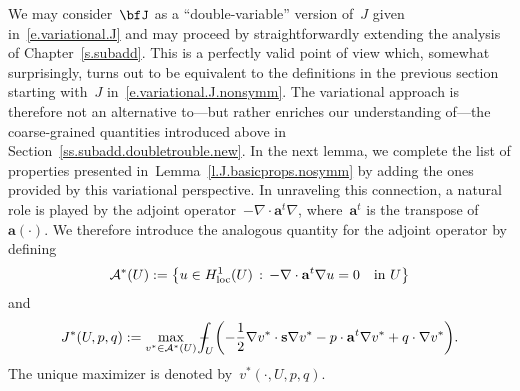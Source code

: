 \documentclass[11pt,twoside]{article} %
\numberwithin{equation}{section}
\theoremstyle{definition}
\let\originalleft\left
\let\originalright\right
\renewcommand{\left}{\mathopen{}\mathclose\bgroup\originalleft}
\renewcommand{\right}{\aftergroup\egroup\originalright}
\newcommand{\s}{\mathbf{s}}
\renewcommand{\a}{\mathbf{a}}
\def\Xint#1{\mathchoice
{\XXint\displaystyle\textstyle{#1}}%
{\XXint\textstyle\scriptstyle{#1}}%
{\XXint\scriptstyle\scriptscriptstyle{#1}}%
{\XXint\scriptscriptstyle\scriptscriptstyle{#1}}%
\!\int}
\def\XXint#1#2#3{{\setbox0=\hbox{$#1{#2#3}{\int}$}
\vcenter{\hbox{$#2#3$}}\kern-.5\wd0}}
\def\fint{\Xint-}
\begin{document}
\smallskip

We may consider~$\bfJ$ as a ``double-variable'' version of~$J$ given in~\eqref{e.variational.J} and may proceed by straightforwardly extending the analysis of Chapter~\ref{s.subadd}.
This is a perfectly valid point of view which, somewhat surprisingly, turns out to be equivalent to the definitions in the previous section starting with~$J$ in~\eqref{e.variational.J.nonsymm}. 
The variational approach is therefore not an alternative to---but rather enriches our understanding of---the coarse-grained quantities introduced above in Section~\ref{ss.subadd.doubletrouble.new}. In the next lemma, we complete the list of properties presented in~Lemma~\ref{l.J.basicprops.nosymm} by adding the ones provided by this variational perspective. In unraveling this connection, a natural role is played by the adjoint operator~$-\nabla \cdot \a^t\nabla$, where~$\a^t$ is the transpose of~$\a(\cdot)$. We therefore introduce the analogous quantity for the adjoint operator by defining
\begin{equation}
\label{e.def.AsU}
\mathcal{A}^*(U) := 
\left\{ 
u\in H^1_{\mathrm{loc}}(U)
\,:\,
-\nabla \cdot \a^t\nabla u = 0 \quad \mbox{in} \ U \right\}
\end{equation}
and 
\begin{equation}
\label{e.variational.J.nonsymm.dual}
J^*(U,p,q) 
:= 
\max_{v^*\in \mathcal{A}^*(U)} 
\fint_U \left( -\frac12 \nabla v^*\cdot \s\nabla v^* -p\cdot \a^t\nabla v^* + q\cdot \nabla v^*   \right).
\end{equation}
The unique maximizer is denoted by~$v^*(\cdot,U,p,q)$.

\smallskip
\end{document}

